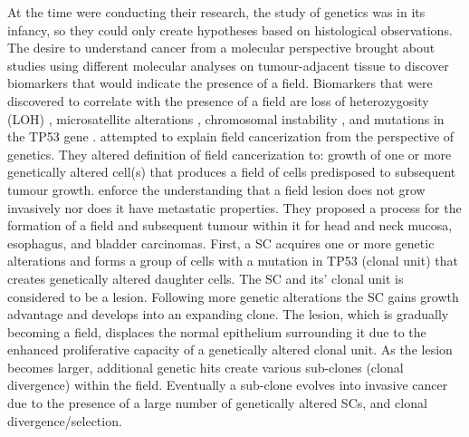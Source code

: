 \documentclass[\main/thesis.tex]{subfiles}
\begin{document}
At the time \textcite{Slaughter} were conducting their research, the study of 
genetics was in its infancy, so they could only create hypotheses based on 
histological observations. The desire to understand cancer from a molecular 
perspective brought about studies using different molecular analyses on 
tumour-adjacent tissue to discover biomarkers that would indicate the presence 
of a field. Biomarkers that were discovered to correlate with the presence of a 
field are loss of heterozygosity (LOH) \parencite{Tabor062001}, microsatellite 
alterations \parencite{Tabor062001}, chromosomal instability 
\parencite{Hittelman}, and mutations in the TP53 gene 
\parencite{Brennan,VanHouten}. \textcite{Braakhuis} attempted to explain field 
cancerization from the perspective of genetics. They altered 
\textcite{Slaughter} definition of field cancerization to: growth of one or more 
genetically altered cell(s) that produces a field of cells predisposed to 
subsequent tumour growth. \textcite{Braakhuis} enforce the understanding that a 
field lesion does not grow invasively nor does it have metastatic properties. 
They proposed a process for the formation of a field and subsequent tumour 
within it for head and neck mucosa, esophagus, and bladder carcinomas. First, a 
SC acquires one or more genetic alterations and forms a group of cells with a 
mutation in TP53 (clonal unit) that creates genetically altered daughter cells. 
The SC and its' clonal unit is considered to be a lesion. Following more genetic 
alterations the SC gains growth advantage and develops into an expanding clone. 
The lesion, which is gradually becoming a field, displaces the normal epithelium 
surrounding it due to the enhanced proliferative capacity of a genetically 
altered clonal unit. As the lesion becomes larger, additional genetic hits 
create various sub-clones (clonal divergence) within the field. Eventually a 
sub-clone evolves into invasive cancer due to the presence of a large number of 
genetically altered SCs, and clonal divergence/selection. 
\end{document}
